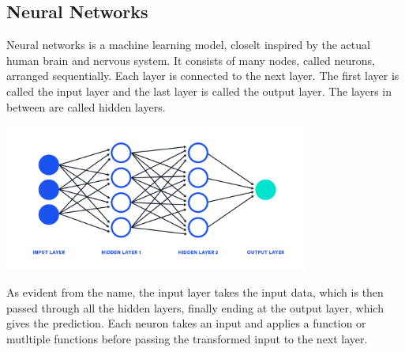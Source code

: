 \documentclass[12pt]{article}
\begin{document}
\subsection{Neural Networks}
Neural networks is a machine learning model, closelt inspired by the actual human brain and nervous system. It consists of many nodes, called neurons, arranged sequentially. Each layer is connected to the next layer. The first layer is called the input layer and the last layer is called the output layer. The layers in between are called hidden layers.\\
\begin{center}
    \includegraphics[width=10cm]{nn-first.png}
\end{center}
As evident from the name, the input layer takes the input data, which is then passed through all the hidden layers, finally ending at the output layer, which gives the prediction. Each neuron takes an input and applies a function or mutltiple functions before passing the transformed input to the next layer.\\
\end{document}
